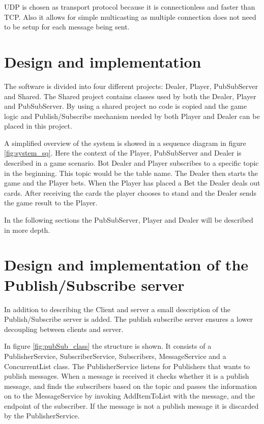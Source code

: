 
UDP is chosen as transport protocol because it is connectionless and faster than TCP. Also it allows for simple multicasting as multiple connection does not need to be setup for each message being sent.

\section{Design and implementation}
The software is divided into four different projects: Dealer, Player, PubSubServer and Shared. The Shared project contains classes used by both the Dealer, Player and PubSubServer. By using a shared project no code is copied and the game logic and Publish/Subscribe mechanism needed by both Player and Dealer can be placed in this project.

A simplified overview of the system is showed in a sequence diagram in figure \ref{fig:system_sq}. Here the context of the Player, PubSubServer and Dealer is described in a game scenario. Bot Dealer and Player subscribes to a specific topic in the beginning. This topic would be the table name. The Dealer then starts the game and the Player bets. When the Player has placed a Bet the Dealer deals out cards. After receiving the cards the player chooses to stand and the Dealer sends the game result to the Player. 

\FloatBarrier

In the following sections the PubSubServer, Player and Dealer will be described in more depth.

\section{Design and implementation of the Publish/Subscribe server}
In addition to describing the Client and server a small description of the Publish/Subscribe server is added. The publish subscribe server ensures a lower decoupling between clients and server.


In figure \ref{fig:pubSub_class} the structure is shown. It consists of a PublisherService, SubscriberService, Subscribers, MessageService and a ConcurrentList class. The PublisherService listens for Publishers that wants to publish messages. When a message is received it checks whether it is a publish message, and finds the subscribers based on the topic and passes the information on to the MessageService by invoking AddItemToList with the message, and the endpoint of the subscriber. If the message is not a publish message it is discarded by the PublisherService.

